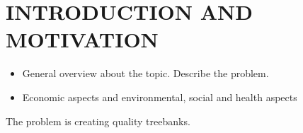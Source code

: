 \chapter{INTRODUCTION AND MOTIVATION}
\label{chapter:introduction}
\begin{itemize}
\item General overview about the topic. Describe the problem.
\item Economic aspects and environmental, social and health aspects
\end{itemize}
The problem is creating quality treebanks.
